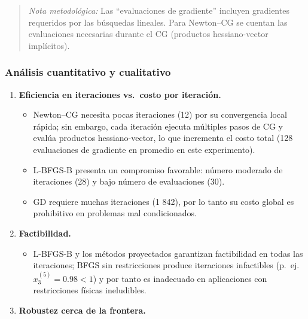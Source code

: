 \documentclass[
  spanish,
  us-letterpaper,
  DIV=11,
  numbers=noendperiod]{scrreprt}
\providecommand{\tightlist}{%
  \setlength{\itemsep}{0pt}\setlength{\parskip}{0pt}}
\numberwithin{equation}{section}
\begin{document}
\begin{quote}
\emph{Nota metodológica:} Las ``evaluaciones de gradiente'' incluyen
gradientes requeridos por las búsquedas lineales. Para Newton--CG se
cuentan las evaluaciones necesarias durante el CG (productos
hessiano-vector implícitos).
\end{quote}

\subsubsection{Análisis cuantitativo y
cualitativo}\label{anuxe1lisis-cuantitativo-y-cualitativo}

\begin{enumerate}
\def\labelenumi{\arabic{enumi}.}
\tightlist
\item
  \textbf{Eficiencia en iteraciones vs.~costo por iteración.}

  \begin{itemize}
  \tightlist
  \item
    Newton--CG necesita pocas iteraciones (12) por su convergencia local
    rápida; sin embargo, cada iteración ejecuta múltiples pasos de CG y
    evalúa productos hessiano-vector, lo que incrementa el costo total
    (128 evaluaciones de gradiente en promedio en este experimento).\\
  \item
    L-BFGS-B presenta un compromiso favorable: número moderado de
    iteraciones (28) y bajo número de evaluaciones (30).
  \item
    GD requiere muchas iteraciones (1 842), por lo tanto su costo global
    es prohibitivo en problemas mal condicionados.
  \end{itemize}
\item
  \textbf{Factibilidad.}

  \begin{itemize}
  \tightlist
  \item
    L-BFGS-B y los métodos proyectados garantizan factibilidad en todas
    las iteraciones; BFGS sin restricciones produce iteraciones
    infactibles (p.~ej. \(x_3^{(5)}=0.98<1\)) y por tanto es inadecuado
    en aplicaciones con restricciones físicas ineludibles.
  \end{itemize}
\item
  \textbf{Robustez cerca de la frontera.}


\end{enumerate}
\end{document}
